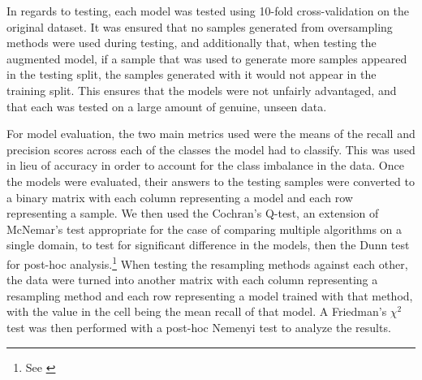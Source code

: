 \documentclass[runningheads]{llncs}
\begin{document}
In regards to testing, each model was tested using 10-fold cross-validation on the original dataset. It was ensured that no samples generated from oversampling methods were used during testing, and additionally that, when testing the augmented model, if a sample that was used to generate more samples appeared in the testing split, the samples generated with it would not appear in the training split. This ensures that the models were not unfairly advantaged, and that each was tested on a large amount of genuine, unseen data.

For model evaluation, the two main metrics used were the means of the recall and precision scores across each of the classes the model had to classify. This was used in lieu of accuracy in order to account for the class imbalance in the data. Once the models were evaluated, their answers to the testing samples were converted to a binary matrix with each column representing a model and each row representing a sample. We then used the Cochran's Q-test, an extension of McNemar's test appropriate for the case of comparing multiple algorithms on a single domain, to test for significant difference in the models, then the Dunn test for post-hoc analysis.\footnote{See \cite{boukouvalas}} When testing the resampling methods against each other, the data were turned into another matrix with each column representing a resampling method and each row representing a model trained with that method, with the value in the cell being the mean recall of that model. A Friedman's $\chi^2$ test was then performed with a post-hoc Nemenyi test to analyze the results.
\end{document}
